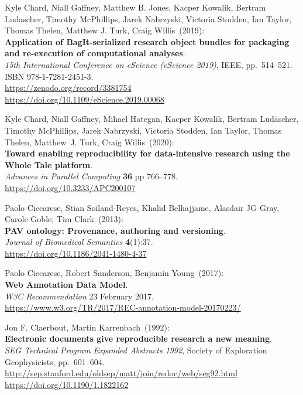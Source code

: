 \begin{thebibliography}{9}
Kyle Chard, Niall Gaffney, Matthew B. Jones, Kacper Kowalik, Bertram Ludascher, Timothy McPhillips, Jarek Nabrzyski, Victoria Stodden, Ian Taylor, Thomas Thelen, Matthew J. Turk, Craig Willis~(2019): \\
\textbf{Application of BagIt-serialized research object bundles for packaging and re-execution of computational analyses}.\\
\emph{15th International Conference on eScience (eScience 2019)}, IEEE,
pp.~514--521.\\
ISBN 978-1-7281-2451-3.\\
\url{https://zenodo.org/record/3381754}\\
\url{https://doi.org/10.1109/eScience.2019.00068}

Kyle Chard, Niall Gaffney, Mihael Hategan, Kacper Kowalik, Bertram Ludäscher, Timothy McPhillips, Jarek Nabrzyski, Victoria Stodden, Ian Taylor, Thomas Thelen, Matthew~J. Turk, Craig Willis~(2020): \\
\textbf{Toward enabling reproducibility for data-intensive research using the Whole Tale platform}.\\
\emph{Advances in Parallel Computing} \textbf{36} pp 766--778.\\
\url{https://doi.org/10.3233/APC200107}

Paolo Ciccarese, Stian Soiland-Reyes, Khalid Belhajjame, Alasdair JG Gray, Carole Goble, Tim Clark~(2013): \\
\textbf{PAV ontology: Provenance, authoring and versioning}. \\
\emph{Journal of Biomedical Semantics} \textbf{4}(1):37.\\
\url{https://doi.org/10.1186/2041-1480-4-37}

Paolo Ciccarese, Robert Sanderson, Benjamin Young~(2017): \\
\textbf{Web Annotation Data Model}.\\
\emph{W3C Recommendation} 23 February 2017.\\
\url{https://www.w3.org/TR/2017/REC-annotation-model-20170223/}

Jon F. Claerbout, Martin Karrenbach~(1992): \\
\textbf{Electronic documents give reproducible research a new meaning}.\\
\emph{SEG Technical Program Expanded Abstracts 1992}, Society of
Exploration Geophysicists, pp.~601--604.\\
\url{http://sep.stanford.edu/oldsep/matt/join/redoc/web/seg92.html}\\
\url{https://doi.org/10.1190/1.1822162}


\end{thebibliography}
